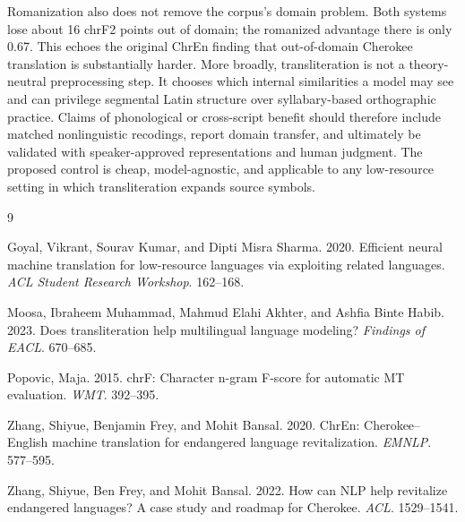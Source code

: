 \documentclass[12pt]{article}
\begin{document}
Romanization also does not remove the corpus's domain problem. Both systems
lose about 16 chrF2 points out of domain; the romanized advantage there is only
0.67. This echoes the original ChrEn finding that out-of-domain Cherokee
translation is substantially harder. More broadly, transliteration is not a
theory-neutral preprocessing step. It chooses which internal similarities a
model may see and can privilege segmental Latin structure over syllabary-based
orthographic practice. Claims of phonological or cross-script benefit should
therefore include matched nonlinguistic recodings, report domain transfer, and
ultimately be validated with speaker-approved representations and human
judgment. The proposed control is cheap, model-agnostic, and applicable to any
low-resource setting in which transliteration expands source symbols.

\vspace{-0.3em}
\begin{thebibliography}{9}
\setlength{\itemsep}{0pt}
\setlength{\parskip}{0pt}

Goyal, Vikrant, Sourav Kumar, and Dipti Misra Sharma. 2020.
\newblock Efficient neural machine translation for low-resource languages via exploiting related languages.
\newblock \textit{ACL Student Research Workshop}. 162--168.

Moosa, Ibraheem Muhammad, Mahmud Elahi Akhter, and Ashfia Binte Habib. 2023.
\newblock Does transliteration help multilingual language modeling?
\newblock \textit{Findings of EACL}. 670--685.

Popovic, Maja. 2015.
\newblock chrF: Character n-gram F-score for automatic MT evaluation.
\newblock \textit{WMT}. 392--395.

Zhang, Shiyue, Benjamin Frey, and Mohit Bansal. 2020.
\newblock ChrEn: Cherokee--English machine translation for endangered language revitalization.
\newblock \textit{EMNLP}. 577--595.

Zhang, Shiyue, Ben Frey, and Mohit Bansal. 2022.
\newblock How can NLP help revitalize endangered languages? A case study and roadmap for Cherokee.
\newblock \textit{ACL}. 1529--1541.

\end{thebibliography}
\end{document}
